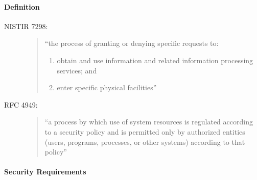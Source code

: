 \documentclass{article}
\begin{document}
                  \paragraph{Definition}
                    \begin{description}
                        \item[NISTIR 7298:] 
                        \begin{quote}
                            “the process of granting or denying
                            specific requests to:
                            \begin{enumerate}[label=(\arabic*)]
                                \item obtain and use information and related information processing services; and
                                \item enter specific physical facilities”
                            \end{enumerate}
                        \end{quote}
                        
                        \item[RFC 4949:] 
                        \begin{quote}
                            “a process by which use of system
                            resources is regulated according to a security
                            policy and is permitted only by authorized
                            entities (users, programs, processes, or
                            other systems) according to that policy”
                        \end{quote}
                    \end{description}
                 \paragraph{Security Requirements}
                    
\end{document}

